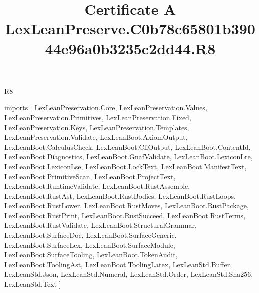 \begin{lexlean}{R8}
\title{Certificate A LexLeanPreserve.C0b78c65801b39044e96a0b3235c2dd44.R8}
\begin{coremodule}
imports [
  LexLeanPreservation.Core,
  LexLeanPreservation.Values,
  LexLeanPreservation.Primitives,
  LexLeanPreservation.Fixed,
  LexLeanPreservation.Keys,
  LexLeanPreservation.Templates,
  LexLeanPreservation.Validate,
  LexLeanBoot.AxiomOutput,
  LexLeanBoot.CalculusCheck,
  LexLeanBoot.CliOutput,
  LexLeanBoot.ContentId,
  LexLeanBoot.Diagnostics,
  LexLeanBoot.GnafValidate,
  LexLeanBoot.LexiconLre,
  LexLeanBoot.LexiconLse,
  LexLeanBoot.LockText,
  LexLeanBoot.ManifestText,
  LexLeanBoot.PrimitiveScan,
  LexLeanBoot.ProjectText,
  LexLeanBoot.RuntimeValidate,
  LexLeanBoot.RustAssemble,
  LexLeanBoot.RustAst,
  LexLeanBoot.RustBodies,
  LexLeanBoot.RustLoops,
  LexLeanBoot.RustLower,
  LexLeanBoot.RustMoves,
  LexLeanBoot.RustPackage,
  LexLeanBoot.RustPrint,
  LexLeanBoot.RustSucceed,
  LexLeanBoot.RustTerms,
  LexLeanBoot.RustValidate,
  LexLeanBoot.StructuralGrammar,
  LexLeanBoot.SurfaceDoc,
  LexLeanBoot.SurfaceGeneric,
  LexLeanBoot.SurfaceLex,
  LexLeanBoot.SurfaceModule,
  LexLeanBoot.SurfaceTooling,
  LexLeanBoot.TokenAudit,
  LexLeanBoot.ToolingAst,
  LexLeanBoot.ToolingLatex,
  LexLeanStd.Buffer,
  LexLeanStd.Json,
  LexLeanStd.Numeral,
  LexLeanStd.Order,
  LexLeanStd.Sha256,
  LexLeanStd.Text
]


\end{coremodule}
\end{lexlean}
